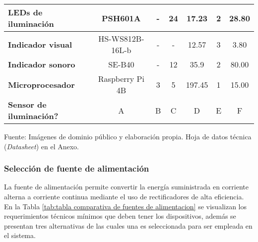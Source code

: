 \begin{mytable}[H]
\begin{tabular}{l|c|c|c|c|c|c|}
		\multicolumn{1}{|l|}{\cellcolor[HTML]{C0C0C0}\textbf{LEDs de iluminación}} & PSH601A & - & 24 & 17.23 & 2 & 28.80 \\ \hline
		\multicolumn{1}{|l|}{\cellcolor[HTML]{C0C0C0}\textbf{Indicador visual}} & HS-WS812B-16L-b & - & - & 12.57 & 3 & 3.80 \\ \hline
		\multicolumn{1}{|l|}{\cellcolor[HTML]{C0C0C0}\textbf{Indicador sonoro}} & SE-B40 & - & 12 & 35.9 & 2 & 80.00 \\ \hline
		\multicolumn{1}{|l|}{\cellcolor[HTML]{C0C0C0}\textbf{Microprocesador}} & Raspberry Pi 4B & 3 & 5 & 197.45 & 1 & 15.00 \\ \hline
		\multicolumn{1}{|l|}{\cellcolor[HTML]{C0C0C0}\textbf{Sensor de iluminación?}} & A & B & C & D & E & F \\ \hline
	\end{tabular}
	\begin{myflushcenteraftertable}	
		Fuente: Imágenes de dominio público y elaboración propia. Hoja de datos técnica (\textit{Datasheet}) en el Anexo.
	\end{myflushcenteraftertable}
\end{mytable}


\subsubsection{Selección de fuente de alimentación} 

La fuente de alimentación permite convertir la energía suministrada en corriente alterna a corriente continua mediante el uso de rectificadores de alta eficiencia. En la Tabla \ref{tab:tabla comparativa de fuentes de alimentacion} se visualizan los requerimientos técnicos mínimos que deben tener los dispositivos, además se presentan tres alternativas de las cuales una es seleccionada para ser empleada en el sistema.

